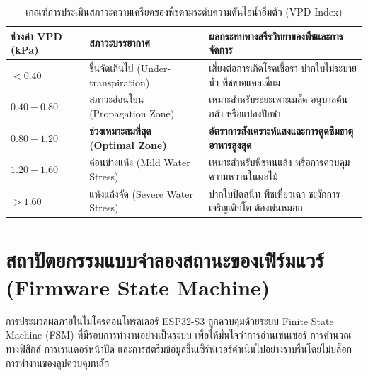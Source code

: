 \begin{table}[htbp]
    \caption{เกณฑ์การประเมินสภาวะความเครียดของพืชตามระดับความดันไอน้ำอิ่มตัว (VPD Index)}
    \label{tab:vpd_criteria}
    \begin{tabularx}{\textwidth}{p{3.0cm}p{3.2cm}Y}
        \toprule
        \textbf{ช่วงค่า VPD (kPa)} & \textbf{สภาวะบรรยากาศ} & \textbf{ผลกระทบทางสรีรวิทยาของพืชและการจัดการ} \\
        \midrule
        $< 0.40$ & ชื้นจัดเกินไป (Under-transpiration) & เสี่ยงต่อการเกิดโรคเชื้อรา ปากใบไม่ระบายน้ำ พืชขาดแคลเซียม \\
        $0.40 - 0.80$ & สภาวะอ่อนโยน (Propagation Zone) & เหมาะสำหรับระยะเพาะเมล็ด อนุบาลต้นกล้า หรือแปลงปักชำ \\
        $\mathbf{0.80 - 1.20}$ & \textbf{ช่วงเหมาะสมที่สุด (Optimal Zone)} & \textbf{อัตราการสังเคราะห์แสงและการดูดซึมธาตุอาหารสูงสุด} \\
        $1.20 - 1.60$ & ค่อนข้างแห้ง (Mild Water Stress) & เหมาะสำหรับพืชทนแล้ง หรือการควบคุมความหวานในผลไม้ \\
        $> 1.60$ & แห้งแล้งจัด (Severe Water Stress) & ปากใบปิดสนิท พืชเหี่ยวเฉา ชะงักการเจริญเติบโต ต้องพ่นหมอก \\
        \bottomrule
    \end{tabularx}
\end{table}

\section{สถาปัตยกรรมแบบจำลองสถานะของเฟิร์มแวร์ (Firmware State Machine)}

การประมวลผลภายในไมโครคอนโทรลเลอร์ ESP32-S3 ถูกควบคุมด้วยระบบ Finite State Machine (FSM) ที่มีรอบการทำงานอย่างเป็นระบบ เพื่อให้มั่นใจว่าการอ่านเซนเซอร์ การคำนวณทางฟิสิกส์ การเรนเดอร์หน้าปัด และการสตรีมข้อมูลขึ้นเซิร์ฟเวอร์ดำเนินไปอย่างราบรื่นโดยไม่บล็อกการทำงานของลูปควบคุมหลัก

